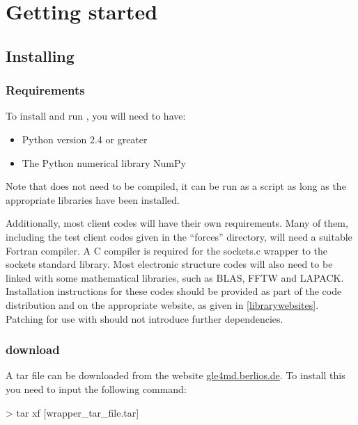 \documentclass[11pt,english,fleqn]{report}
\newenvironment{code}{%
\footnotesize 
\verbatim
}{
\endverbatim
\normalsize
}
\begin{document}
\chapter{Getting started}

\label{getstarted}


\section{Installing \ipi}

\label{install}


\subsection{Requirements}

To install and run \ipi, you will need to have:
\begin{itemize}
\item Python version 2.4 or greater
\item The Python numerical library NumPy
\end{itemize}
Note that \ipi does not need to be compiled, it can be run as a script
as long as the appropriate libraries have been installed.

Additionally, most client codes will have their own requirements.
Many of them, including the test client codes given in the {}``forces''
directory, will need a suitable Fortran compiler. A C compiler is
required for the sockets.c wrapper to the sockets standard library.
Most electronic structure codes will also need to be linked with some
mathematical libraries, such as BLAS, FFTW and LAPACK. Installation
instructions for these codes should be provided as part of the code
distribution and on the appropriate website, as given in \ref{librarywebsites}.
Patching for use with \ipi{} should not introduce further dependencies.


\subsection{\ipi download}

A tar file can be downloaded from the website \url{gle4md.berlios.de}.
To install this you need to input the following command:


\begin{code}
> tar xf [wrapper\_tar\_file.tar]
\end{code}
\end{document}
